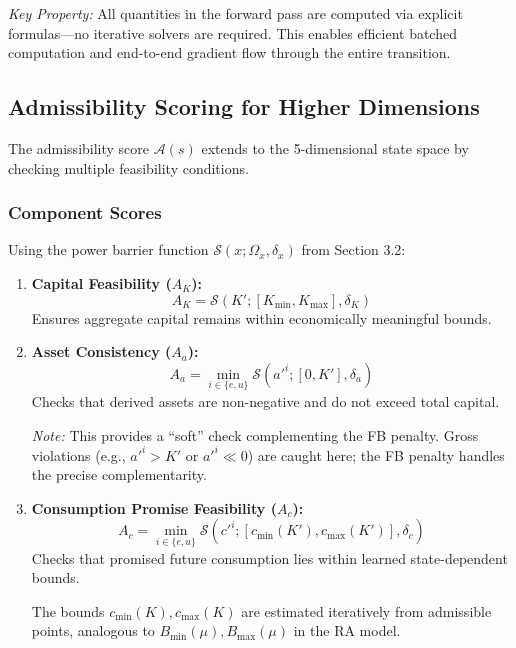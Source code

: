\vspace{0.5em}
\textit{Key Property:} All quantities in the forward pass are computed via explicit formulas—no iterative solvers are required. This enables efficient batched computation and end-to-end gradient flow through the entire transition.


\subsection{Admissibility Scoring for Higher Dimensions}

The admissibility score $\mathcal{A}(s)$ extends to the 5-dimensional state space by checking multiple feasibility conditions.

\subsubsection{Component Scores}
Using the power barrier function $\mathcal{S}(x; \Omega_x, \delta_x)$ from Section 3.2:

\begin{enumerate}
    \item \textbf{Capital Feasibility ($A_K$):}
    \begin{equation}
        A_K = \mathcal{S}(K'; [K_{\min}, K_{\max}], \delta_K)
    \end{equation}
    Ensures aggregate capital remains within economically meaningful bounds.
    
    \item \textbf{Asset Consistency ($A_a$):}
    \begin{equation}
        A_a = \min_{i \in \{e, u\}} \mathcal{S}(a'^i; [0, K'], \delta_a)
    \end{equation}
    Checks that derived assets are non-negative and do not exceed total capital.
    
    \textit{Note:} This provides a ``soft'' check complementing the FB penalty. Gross violations (e.g., $a'^i > K'$ or $a'^i \ll 0$) are caught here; the FB penalty handles the precise complementarity.
    
    \item \textbf{Consumption Promise Feasibility ($A_c$):}
    \begin{equation}
        A_c = \min_{i \in \{e, u\}} \mathcal{S}(c'^i; [c_{\min}(K'), c_{\max}(K')], \delta_c)
    \end{equation}
    Checks that promised future consumption lies within learned state-dependent bounds.
    
    The bounds $c_{\min}(K), c_{\max}(K)$ are estimated iteratively from admissible points, analogous to $B_{\min}(\mu), B_{\max}(\mu)$ in the RA model.
\end{enumerate}

